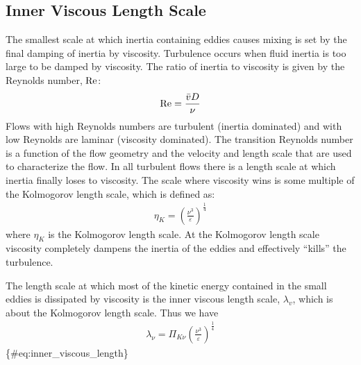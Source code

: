\documentclass[letterpaper,10pt,english]{sphinxmanual}
\begin{document}
%
\begin{sphinxVerbatim}[commandchars=\\\{\}]
\end{sphinxVerbatim}


\subsection{Inner Viscous Length Scale}
\label{\detokenize{Rapid_Mix/RM_Theory_and_Future_Work:inner-viscous-length-scale}}\label{\detokenize{Rapid_Mix/RM_Theory_and_Future_Work:heading-inner-viscous-length-scale}}
The smallest scale at which inertia containing eddies causes mixing is set by the final damping of inertia by viscosity. Turbulence occurs when fluid inertia is too large to be damped by viscosity. The ratio of inertia to viscosity is given by the Reynolds number, \(\rm Re\):
\begin{equation}\label{equation:Rapid_Mix/RM_Theory_and_Future_Work:Rapid_Mix/RM_Theory_and_Future_Work:17}
\begin{split}{\rm{Re}} = \frac{\bar vD}{\nu}\end{split}
\end{equation}
Flows with high Reynolds numbers are turbulent (inertia dominated) and with low Reynolds are laminar (viscosity dominated). The transition Reynolds number is a function of the flow geometry and the velocity and length scale that are used to characterize the flow. In all turbulent flows there is a length scale at which inertia finally loses to viscosity. The scale where viscosity wins is some multiple of the Kolmogorov length scale, which is defined as:
\begin{equation}\label{equation:Rapid_Mix/RM_Theory_and_Future_Work:Rapid_Mix/RM_Theory_and_Future_Work:18}
\begin{split}\eta_K = \left( \frac{\nu^3}{\varepsilon} \right)^{\frac{1}{4}}\end{split}
\end{equation}
where \(\eta_K\) is the Kolmogorov length scale. At the Kolmogorov length scale viscosity completely dampens the inertia of the eddies and effectively “kills” the turbulence.

The length scale at which most of the kinetic energy contained in the small eddies is dissipated by viscosity is the inner viscous length scale, \(\lambda_v\), which is about  the
Kolmogorov length scale. Thus we have
\begin{equation}\label{equation:Rapid_Mix/RM_Theory_and_Future_Work:Rapid_Mix/RM_Theory_and_Future_Work:19}
\begin{split}\lambda_\nu = \Pi_{K\nu}\left( \frac{\nu^3}{\varepsilon} \right)^{\frac{1}{4}}\end{split}
\end{equation}
\{\#eq:inner\_viscous\_length\}
\end{document}

